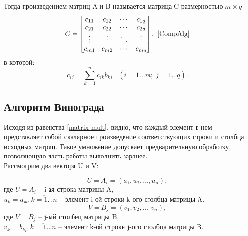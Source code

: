\documentclass[12pt, a4paper]{report}
\begin{document}
	Тогда произведением матриц A и B называется матрица C размерностью  $m \times q$ \cite{Belousov}
	\begin{equation}
	\label{matrix-mult}
	C = \begin{bmatrix} 
	c_{11} & c_{12} & \cdots & c_{1q} \\
	c_{21} & c_{22} & \cdots & c_{2q} \\ 
	\vdots & \vdots & \ddots & \vdots \\ 
	c_{m1} & c_{m2} & \cdots & c_{mq}	
	\end{bmatrix}, ~\cite{CompAlg}
	\end{equation}
	в которой:
	$$c_{ij} = \sum_{k=1}^n a_{ik}b_{kj} \;\;\; \left(\overline{i = 1 \ldots m};\;\overline{j = 1 \ldots q} \right).$$

	\subsection{Алгоритм Винограда}
	Исходя из равенства \ref{matrix-mult}, видно, что каждый элемент в нем представляет собой скалярное произведение соответствующих строки и столбца исходных матриц. Такое умножение допускает предварительную обработку, позволяющую часть работы выполнить заранее. ~\cite{Winograd}\\
	Рассмотрим два вектора U и V:
	
	\begin{equation}
	\label{u-def}
	U = A_{i} = (u_{1}, u_{2}, \ldots, u_{n}),
	\end{equation}
	где $U = A_{i}$ -- i-ая строка матрицы A,\\
	$u_{k} = a_{ik}, \overline{k = 1 \ldots n}$ -- элемент i-ой строки k-ого столбца матрицы A.\\
	
	\begin{equation}
	\label{v-def}
	V = B_{j} = (v_{1}, v_{2}, \ldots, v_{n}),
	\end{equation}
	где $V = B_{j}$ -- j-ый столбец матрицы B,\\
	$v_{k} = b_{kj}, \overline{k = 1 \ldots n}$ -- элемент k-ой строки j-ого столбца матрицы B.\\
	
\end{document}

